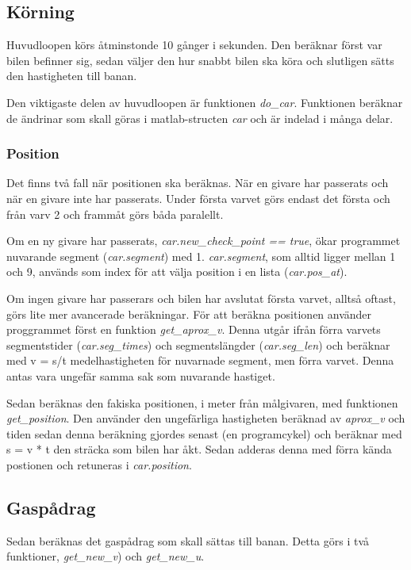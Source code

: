 \documentclass[10pt,oneside,swedish]{lips-no_customer}
\begin{document}
\subsection{Körning}

Huvudloopen körs åtminstonde 10 gånger i sekunden. Den beräknar först var bilen
befinner sig, sedan väljer den hur snabbt bilen ska köra och slutligen sätts den
hastigheten till banan.

Den viktigaste delen av huvudloopen är funktionen \emph{do\_car}. Funktionen
beräknar de ändrinar som skall göras i matlab-structen \emph{car} och är indelad
i många delar.

\subsubsection{Position}

Det finns två fall när positionen ska beräknas. När en givare har passerats och
när en givare inte har passerats. Under första varvet görs endast det första och
från varv 2 och frammåt görs båda paralellt. 

Om en ny givare har passerats, \emph{car.new\_check\_point == true}, ökar
programmet nuvarande segment (\emph{car.segment}) med 1. \emph{car.segment}, som
alltid ligger mellan 1 och 9, används som index för att välja position i en
lista (\emph{car.pos\_at}). 

Om ingen givare har passerars och bilen har avslutat första varvet, alltså
oftast, görs lite mer avancerade beräkningar. För att beräkna positionen
använder proggrammet först en funktion \emph{get\_aprox\_v}. Denna utgår ifrån
förra varvets segmentstider (\emph{car.seg\_times}) och segmentslängder
(\emph{car.seg\_len}) och beräknar med v = s/t medelhastigheten för nuvarnade
segment, men förra varvet. Denna antas vara ungefär samma sak som nuvarande
hastiget. 

Sedan beräknas den fakiska positionen, i meter från målgivaren, med funktionen
\emph{get\_position}. Den använder den ungefärliga hastigheten beräknad av
\emph{aprox\_v} och tiden sedan denna beräkning gjordes senast (en programcykel)
och beräknar med s = v * t den sträcka som bilen har åkt. Sedan adderas denna
med förra kända postionen och retuneras i \emph{car.position}. 

\subsection{Gaspådrag}

Sedan beräknas det gaspådrag som skall sättas till banan. Detta görs i två
funktioner, \emph{get\_new\_v}) och \emph{get\_new\_u}.
 
\end{document}
